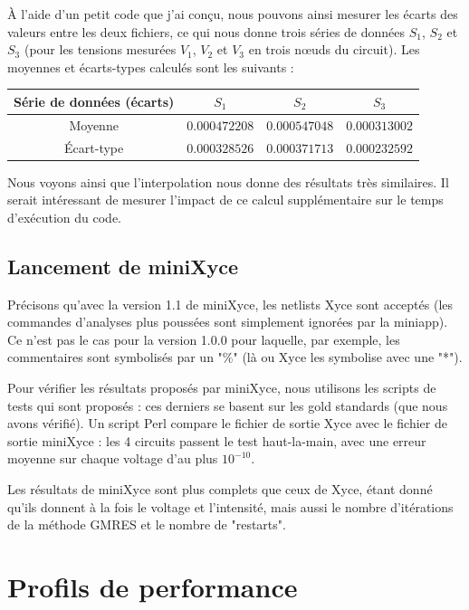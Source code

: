\documentclass[11pt,a4paper,oneside]{memoir}
\theoremstyle{definition}
\theoremstyle{remark}
\theoremstyle{plain}
\begin{document}
\`A l'aide d'un petit code que j'ai conçu, nous pouvons ainsi mesurer les écarts des valeurs entre les deux fichiers, ce qui nous donne trois séries de données $S_1$, $S_2$ et $S_3$ (pour les tensions mesurées $V_1$, $V_2$ et $V_3$ en trois nœuds du circuit). Les moyennes et écarts-types calculés sont les suivants :
\begin{center}
\begin{tabular}{|c|c|c|c|}
\hline
Série de données (écarts) & $S_1$ & $S_2$ & $S_3$\\ \hline
Moyenne & $0.000472208$ & $0.000547048$ & $0.000313002$ \\ \hline
\'Ecart-type & $0.000328526$ & $0.000371713$ & $0.000232592$ \\ \hline
\end{tabular}
\end{center}

Nous voyons ainsi que l'interpolation nous donne des résultats très similaires. Il serait intéressant de mesurer l'impact de ce calcul supplémentaire sur le temps d'exécution du code.




\subsection{Lancement de miniXyce}

Précisons qu'avec la version 1.1 de miniXyce, les netlists Xyce sont acceptés (les commandes d'analyses plus poussées sont simplement ignorées par la miniapp). Ce n'est pas le cas pour la version 1.0.0 pour laquelle, par exemple, les commentaires sont symbolisés par un "\%" (là ou Xyce les symbolise avec une "*").

Pour vérifier les résultats proposés par miniXyce, nous utilisons les scripts de tests qui sont proposés : ces derniers se basent sur les gold standards (que nous avons vérifié). Un script Perl compare le fichier de sortie Xyce avec le fichier de sortie miniXyce : les 4 circuits passent le test haut-la-main, avec une erreur moyenne sur chaque voltage d'au plus $10^{-10}$.

Les résultats de miniXyce sont plus complets que ceux de Xyce, étant donné qu'ils donnent à la fois le voltage et l'intensité, mais aussi le nombre d'itérations de la méthode GMRES et le nombre de "restarts".





\section{Profils de performance}
\end{document}
